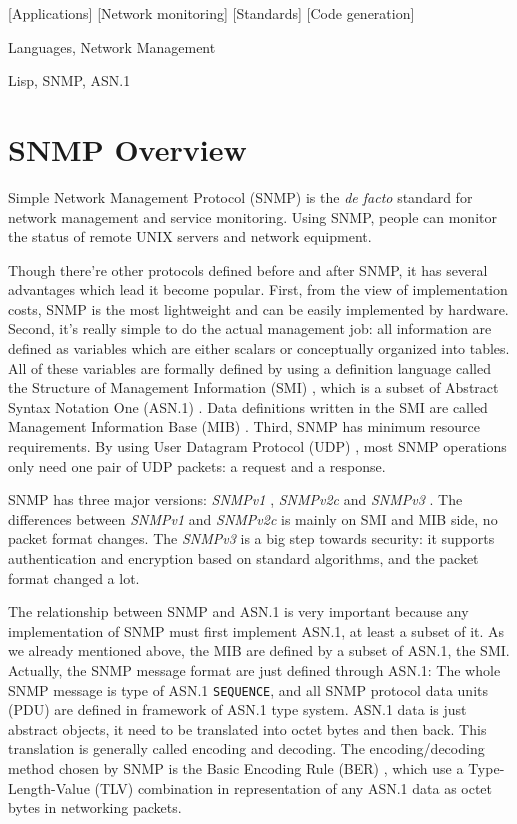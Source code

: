 \documentclass[reprint,natbib,9pt]{sigplanconf}
\begin{document}
[Applications]
[Network monitoring]
[Standards]
[Code generation]

\terms
Languages, Network Management

\keywords
Lisp, SNMP, ASN.1

\section{SNMP Overview}

Simple Network Management Protocol (SNMP) is the \textit{de facto}
standard for network management and service monitoring. Using SNMP,
people can monitor the status of remote UNIX servers and network
equipment.

Though there're other protocols defined before and after
SNMP, it has several advantages which lead it become popular. First,
from the view of implementation costs, SNMP is the most lightweight and
can be easily implemented by hardware. Second, it's really simple to
do the actual management job: all information are defined as variables
which are either scalars or conceptually organized into tables. All of
these variables are formally defined by using a definition language
called the Structure of Management Information (SMI) \cite{RFC:2578},
which is a subset
of Abstract Syntax Notation One (ASN.1) \cite{ISO:ASN.1}.
Data definitions written
in the SMI are called Management Information Base (MIB) \cite{RFC:3418}.
Third, SNMP has minimum resource requirements.
By using User Datagram Protocol (UDP) \cite{RFC:768},
most SNMP operations only need one pair of UDP packets: a request and
a response.

SNMP has three major versions: \textsl{SNMPv1} \cite{RFC:1157},
\textsl{SNMPv2c} \cite{RFC:1901} and
\textsl{SNMPv3} \cite{RFC:3411}. The differences between \textsl{SNMPv1} and
\textsl{SNMPv2c} is mainly on SMI and MIB side, no packet format changes.
The \textsl{SNMPv3} is a big step towards security: it supports authentication
and encryption based on standard algorithms, and the packet format
changed a lot.

The relationship between SNMP and ASN.1 is very important because
any implementation of SNMP must first implement ASN.1, at least a subset of it.
As we already mentioned above, the MIB are defined by a subset of ASN.1,
the SMI. Actually, the SNMP message format are just defined through
ASN.1: The whole SNMP message is type of ASN.1 \texttt{SEQUENCE}, and
all SNMP protocol data units (PDU) are defined in framework of ASN.1 type
system. ASN.1 data is just abstract objects, it need to be translated
into octet bytes and then back. This translation is generally called encoding and
decoding.
The encoding/decoding method chosen by SNMP is the
Basic Encoding Rule (BER) \cite{ISO:BER},
which use a Type-Length-Value (TLV) combination in representation of any
ASN.1 data as octet bytes in networking packets.
\end{document}
